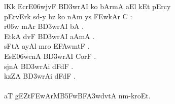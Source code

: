 \documentclass[12pt]{book}
\begin{document}

{\dn l\?Kk EcrE\306wjvF B\3D3wrAI ko bAr\?mA aEl kEt pErcy\\
pErvErk sd-y hz ko nAm ys \3FEwkAr C {\rs :\re} \\
r\?\306w mAr B\3D3wrAI bA .\\
EtkA d\?vF B\3D3wrAI aAmA . \\
sFtA ayA\0l m\?ro E\3FAwmtF . \\
EsE\306wcnA B\3D3wrAI CorF . \\
sjnA B\3D3wrAi dFdF . \\
kzZA B\3D3wrAi dFdF . \\
}
\\
{\dn aT gEZt\3FEwArMB\?\35FwBF\3A3wd\?vtA\2 nm-kroEt.}
\end{document}
